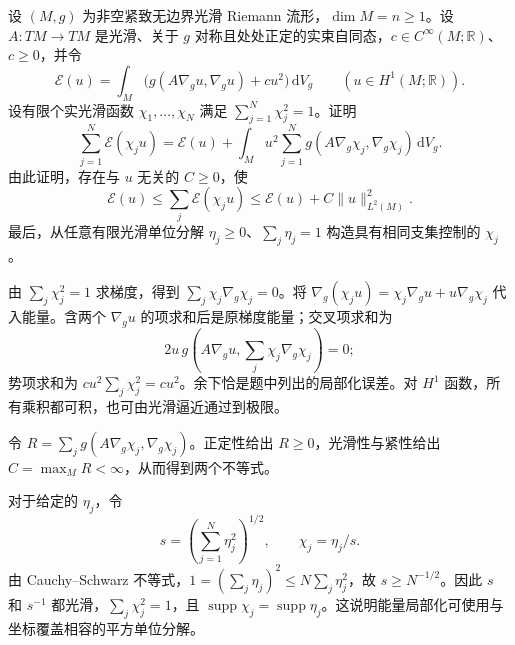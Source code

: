 \begin{exercise}[平方单位分解与能量局部化]\label{b2:ex:28-square-partition-energy}
设 \((M,g)\) 为非空紧致无边界光滑 Riemann 流形，\(\dim M=n\geq1\)。设 \(A:TM\to TM\) 是光滑、关于 \(g\) 对称且处处正定的实束自同态，\(c\in C^\infty(M;\mathbb R)\)、\(c\geq0\)，并令
\[
 \mathcal E(u)=\int_M\bigl(g(A\nabla_g u,\nabla_g u)+cu^2\bigr)\,\mathrm dV_g
 \qquad(u\in H^1(M;\mathbb R)).
\]
设有限个实光滑函数 \(\chi_1,\ldots,\chi_N\) 满足 \(\sum_{j=1}^N\chi_j^2=1\)。证明
\[
 \sum_{j=1}^N\mathcal E(\chi_j u)
 =\mathcal E(u)+\int_Mu^2\sum_{j=1}^N
       g(A\nabla_g\chi_j,\nabla_g\chi_j)\,\mathrm dV_g.
\]
由此证明，存在与 \(u\) 无关的 \(C\geq0\)，使
\[
 \mathcal E(u)\leq\sum_j\mathcal E(\chi_j u)
       \leq\mathcal E(u)+C\|u\|_{L^2(M)}^2.
\]
最后，从任意有限光滑单位分解 \(\eta_j\geq0\)、\(\sum_j\eta_j=1\) 构造具有相同支集控制的 \(\chi_j\)。
\end{exercise}
\begin{solution}
由 \(\sum_j\chi_j^2=1\) 求梯度，得到
\(\sum_j\chi_j\nabla_g\chi_j=0\)。将
\(\nabla_g(\chi_j u)=\chi_j\nabla_g u+u\nabla_g\chi_j\)
代入能量。含两个 \(\nabla_g u\) 的项求和后是原梯度能量；交叉项求和为
\[
 2u\,g\left(A\nabla_g u,\sum_j\chi_j\nabla_g\chi_j\right)=0;
\]
势项求和为 \(cu^2\sum_j\chi_j^2=cu^2\)。余下恰是题中列出的局部化误差。对 \(H^1\) 函数，所有乘积都可积，也可由光滑逼近通过到极限。

令 \(R=\sum_jg(A\nabla_g\chi_j,\nabla_g\chi_j)\)。正定性给出 \(R\geq0\)，光滑性与紧性给出 \(C=\max_MR<\infty\)，从而得到两个不等式。

对于给定的 \(\eta_j\)，令
\[
 s=\left(\sum_{j=1}^N\eta_j^2\right)^{1/2},\qquad
 \chi_j=\eta_j/s.
\]
由 Cauchy--Schwarz 不等式，\(1=(\sum_j\eta_j)^2\leq N\sum_j\eta_j^2\)，故 \(s\geq N^{-1/2}\)。因此 \(s\) 和 \(s^{-1}\) 都光滑，\(\sum_j\chi_j^2=1\)，且 \(\operatorname{supp}\chi_j=\operatorname{supp}\eta_j\)。这说明能量局部化可使用与坐标覆盖相容的平方单位分解。
\end{solution}


